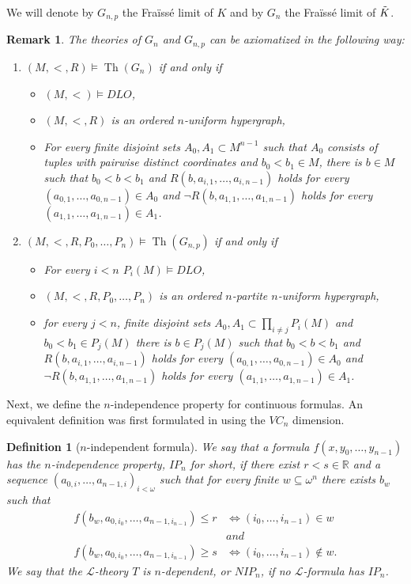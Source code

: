 \documentclass{amsart}
\newtheorem{defin}[teor]{Definition}
\newtheorem{remark}[teor]{Remark}
\newtheorem{external claim}[teor]{Claim}
\newcommand{\mL}{\mathcal{L}}
\DeclareMathOperator{\Th}{{Th}}
\begin{document}
We will denote by $G_{n,p}$ the Fraïssé limit of $K$ and by $G_n$ the Fraïssé limit of $\Tilde{K}$.

\begin{remark}
    The theories of $G_n$ and $G_{n,p}$ can be axiomatized in the following way:
    \begin{enumerate}
        \item[1.] $(M, <, R)\models \Th(G_n)$ if and only if
        \begin{itemize}
            \item $(M,<)\models DLO$,
            \item $(M, <, R)$ is an ordered $n$-uniform hypergraph,
            \item For every finite disjoint sets $A_0,A_1\subset M^{n-1}$ such that $A_0$ consists of tuples with pairwise distinct coordinates and $b_0<b_1\in M$, there is $b\in M$ such that $b_0<b<b_1$ and $R(b,a_{i,1},\dots,a_{i,n-1})$ holds for every $(a_{0,1},\dots,a_{0,n-1})\in A_0$ and $\neg R(b,a_{1,1},\dots,a_{1,n-1})$ holds for every $(a_{1,1},\dots,a_{1,n-1})\in A_1$.
        \end{itemize}
        \item[2.] $(M, <, R, P_0,\dots, P_n)\models \Th(G_{n,p})$ if and only if
        \begin{itemize}
            \item For every $i<n$ $P_i(M)\models DLO$,
            \item $(M, <, R, P_0,\dots, P_n)$ is an ordered $n$-partite $n$-uniform hypergraph,
            \item for every $j<n$, finite disjoint sets $A_0,A_1\subset \prod_{i\neq j} P_i(M)$ and $b_0<b_1\in P_j(M)$ there is $b\in P_j(M)$ such that $b_0<b<b_1$ and $R(b,a_{i,1},\dots,a_{i,n-1})$ holds for every $(a_{0,1},\dots,a_{0,n-1})\in A_0$ and $\neg R(b,a_{1,1},\dots,a_{1,n-1})$ holds for every $(a_{1,1},\dots,a_{1,n-1})\in A_1$.
        \end{itemize}
    \end{enumerate}
\end{remark}

Next, we define the $n$-independence property for continuous formulas. An equivalent definition was first formulated in \cite{Chernikov2020HypergraphRA} using the $VC_n$ dimension.

\begin{defin}[$n$-independent formula]
     We say that a formula $f(x,y_0,\dots,y_{n-1})$ \emph{ has the $n$-independence property}, $IP_n$ for short, if there exist $r<s\in\mathbb{R}$ and a sequence $(a_{0,i},\dots, a_{n-1,i})_{i< \omega}$ such that for every finite $w\subseteq \omega^n$ there exists $b_w$ such that 
     \begin{align*}
         f(b_w, a_{0,i_0},\dots, a_{n-1,i_{n-1}}  )\leq r &\iff (i_0,\dots, i_{n-1})\in w\\
         &and\\
         f(b_w, a_{0,i_0},\dots, a_{n-1,i_{n-1}}  )\geq s &\iff (i_0,\dots, i_{n-1})\notin w.
     \end{align*} We say that the $\mL$-theory $T$ is \emph{$n$-dependent}, or $NIP_n$, if no $\mL$-formula has $IP_n$. 
\end{defin}
\end{document}
